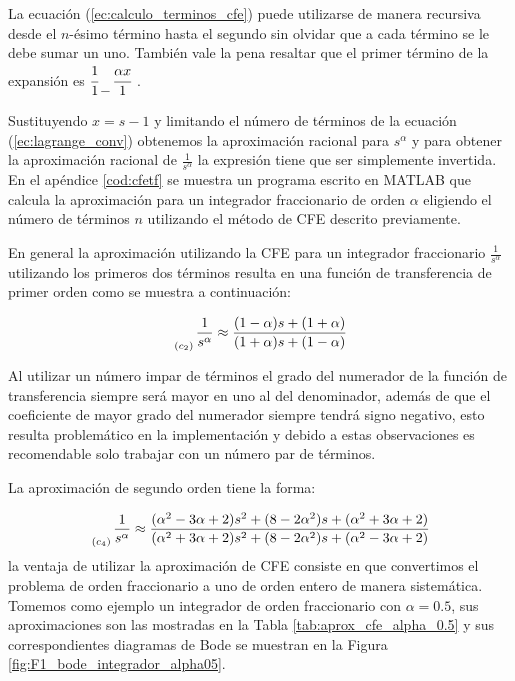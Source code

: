 	La ecuación (\ref{ec:calculo_terminos_cfe}) puede utilizarse de manera recursiva desde el $n$-ésimo término hasta el segundo sin olvidar que a cada término se le debe sumar un uno. También vale la pena resaltar que el primer término de la expansión es $\cfrac{1}{1} \genfrac{}{}{0pt}{0}{}{-} \cfrac{\alpha x}{1}$ . 

	Sustituyendo $x = s - 1$ y limitando el número de términos de la ecuación (\ref{ec:lagrange_conv}) obtenemos la aproximación racional para $s^{\alpha}$ y para obtener la aproximación racional de $\frac{1}{s^{\alpha}}$ la expresión tiene que ser simplemente invertida. En el apéndice \ref{cod:cfetf} se muestra un programa escrito en MATLAB que calcula la aproximación para un integrador fraccionario de orden $\alpha$ eligiendo el número de términos $n$ utilizando el método de CFE descrito previamente.

	En general la aproximación utilizando la CFE para un integrador fraccionario $\frac{1}{s^{\alpha}}$ utilizando los primeros dos términos resulta en una función de transferencia de primer orden como se muestra a continuación:

	\begin{equation}
		\genfrac{}{}{0pt}{0}{}{_{(c_{2})}} \frac{1}{s^{\alpha}} \approx \frac{(1 - \alpha)s + (1 + \alpha) }{(1 + \alpha)s + (1 - \alpha)} 
	\end{equation}

	Al utilizar un número impar de términos el grado del numerador de la función de transferencia siempre será mayor en uno al del denominador, además de que el coeficiente de mayor grado del numerador siempre tendrá signo negativo, esto resulta problemático en la implementación y debido a estas observaciones es recomendable solo trabajar con un número par de términos.

	La aproximación de segundo orden tiene la forma:

	\begin{equation}
		\genfrac{}{}{0pt}{0}{}{_{(c_{4})}} \frac{1}{s^{\alpha}} \approx \frac{(\alpha^{2} - 3\alpha + 2) s^{2} + (8 - 2 \alpha^{2})s + (\alpha^{2} + 3\alpha + 2) }{(\alpha^{2} + 3\alpha + 2) s^{2} + (8 - 2 \alpha^{2})s + (\alpha^{2} - 3\alpha + 2)}
	\end{equation}
	la ventaja de utilizar la aproximación de CFE consiste en que convertimos el problema de orden fraccionario a uno de orden entero de manera sistemática. Tomemos como ejemplo un integrador de orden fraccionario con $\alpha = 0.5$, sus aproximaciones son las mostradas en la Tabla \ref{tab:aprox_cfe_alpha_0.5} y sus correspondientes diagramas de Bode se muestran en la Figura \ref{fig:F1_bode_integrador_alpha05}.


